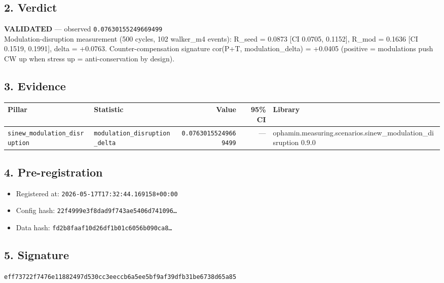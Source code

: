 \documentclass{article}
\begin{document}
\subsection*{2. Verdict}
\textcolor{validated}{\textbf{VALIDATED}} --- observed \texttt{0.07630155249669499}\\
Modulation-disruption measurement (500 cycles, 102 walker\_m4 events): R\_seed = 0.0873 [CI 0.0705, 0.1152], R\_mod = 0.1636 [CI 0.1519, 0.1991], delta = +0.0763. Counter-compensation signature cor(P+T, modulation\_delta) = +0.0405 (positive = modulations push CW up when stress up = anti-conservation by design).
\subsection*{3. Evidence}
\begin{tabular}{llrrl}\toprule
\textbf{Pillar} & \textbf{Statistic} & \textbf{Value} & \textbf{95\% CI} & \textbf{Library} \\\midrule
\texttt{sinew\_modulation\_disruption} & \texttt{modulation\_disruption\_delta} & \texttt{0.07630155249669499} & --- & ophamin.measuring.scenarios.sinew\_modulation\_disruption 0.9.0 \\
\bottomrule\end{tabular}
\subsection*{4. Pre-registration}
\begin{itemize}
\item Registered at: \texttt{2026-05-17T17:32:44.169158+00:00}
\item Config hash: \texttt{22f4999e3f8dad9f743ae5406d741096\dots}
\item Data hash: \texttt{fd2b8faaf10d26df1b01c6056b090ca8\dots}
\end{itemize}
\subsection*{5. Signature}
\texttt{eff73722f7476e11882497d530cc3eeccb6a5ee5bf9af39dfb31be6738d65a85}\\
\end{document}
